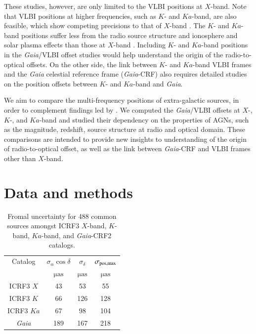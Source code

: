 \documentclass{aa}
\begin{document}
   These studies, however, are only limited to the VLBI positions at $X$-band.
   Note that VLBI positions at higher frequencies, such as $K$- and $Ka$-band, are also feasible, which show competing precisions to that of $X$-band \citep[e.g.,][]{2019evga.confP.302J,2019evga.confP.306D}.
   The $K$- and $Ka$-band positions suffer less from the radio source structure and ionosphere and solar plasma effects than those at $X$-band \citep[e.g.,][]{2002ivsg.conf..350J}.
   Including $K$- and $Ka$-band positions in the \textit{Gaia}/VLBI offset studies would help understand the origin of the radio-to-optical offsets.
   On the other side, the link between $K$- and $Ka$-band VLBI frames and the \textit{Gaia} celestial reference frame (\textit{Gaia}-CRF) also requires detailed studies on the position offsets between $K$- and $Ka$-band and \textit{Gaia}.

   We aim to compare the multi-frequency positions of extra-galactic sources, in order to complement findings led by \citet{2019MNRAS.482.3023P}.
   We computed the \textit{Gaia}/VLBI offsets at $X$-, $K$-, and $Ka$-band and studied their dependency on the properties of AGNs, such as the magnitude, redshift, source structure at radio and optical domain.
   These comparisons are intended to provide new insights to understanding of the origin of radio-to-optical offset, as well as the link between \textit{Gaia}-CRF and VLBI frames other than $X$-band.


\section{Data and methods}    \label{sec:obs}

    \begin{table}[htbp]
        \centering
        \caption{\label{tab:median-err}
            Fromal uncertainty for 488 common sources amongst ICRF3 $X$-band, $K$-band, $Ka$-band, and \textit{Gaia}-CRF2 catalogs.
        }
        \begin{tabular}{cccc}
            \hline \noalign{\smallskip}
            Catalog &$\sigma_\alpha\cos\delta$  &$\sigma_\delta$  &$\sigma_{\rm pos,max}$\\
            & $\mathrm{\mu as}$ & $\mathrm{\mu as}$  & $\mathrm{\mu as}$ \\
            \noalign{\smallskip}
            \hline
            \noalign{\smallskip}
            ICRF3 $X$      & 43  & 53  & 55  \\
            ICRF3 $K$      & 66  &126  &128  \\
            ICRF3 $Ka$     & 67  & 98  &104  \\
            \textit{Gaia}  &189  &167  &218 \\
            \hline
        \end{tabular}
    \end{table}
\end{document}
